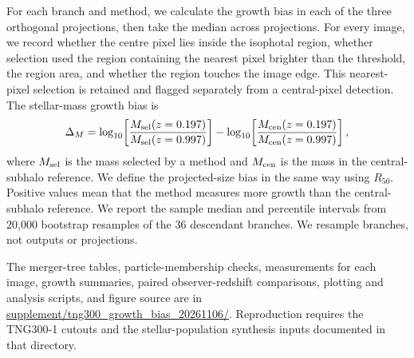 \documentclass[usenatbib]{mnras}
\begin{document}
For each branch and method, we calculate the growth bias in each of the
three orthogonal projections, then take the median across projections.
For every image, we record whether the centre pixel lies inside the
isophotal region, whether selection used the region containing the
nearest pixel brighter than the threshold, the region area, and whether
the region touches the image edge. This nearest-pixel selection is
retained and flagged separately from a central-pixel detection. The stellar-mass growth bias is
\begin{equation}
\Delta_{M}=\log_{10}\!\left[\frac{M_{\rm sel}(z=0.197)}{M_{\rm sel}(z=0.997)}\right]
-\log_{10}\!\left[\frac{M_{\rm cen}(z=0.197)}{M_{\rm cen}(z=0.997)}\right],
\end{equation}
where $M_{\rm sel}$ is the mass selected by a method and $M_{\rm cen}$ is
the mass in the central-subhalo reference. We define the projected-size
bias in the same way using $R_{50}$. Positive values mean that the method
measures more growth than the central-subhalo reference. We report the
sample median and percentile intervals from 20,000 bootstrap resamples of
the 36 descendant branches. We resample branches, not outputs or
projections.

The merger-tree tables, particle-membership checks, measurements for
each image, growth summaries, paired observer-redshift comparisons,
plotting and analysis scripts, and figure source are in
\url{supplement/tng300_growth_bias_20261106/}. Reproduction requires the
TNG300-1 cutouts and the stellar-population synthesis inputs documented in
that directory.
\end{document}
